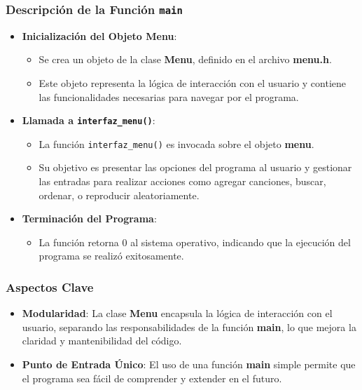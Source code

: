 \documentclass[corference]{IEEEtran}
\begin{document}
\begin{flushleft}
        \subsubsection{Descripción de la Función \texttt{main}}
        
            \begin{itemize}[left=4em]
                \item \textbf{Inicialización del Objeto Menu}: 
                \begin{itemize}
                    \item Se crea un objeto de la clase \textbf{Menu}, definido en el archivo \textbf{menu.h}.
                    \item Este objeto representa la lógica de interacción con el usuario y contiene las funcionalidades necesarias para navegar por el programa.
                \end{itemize}
            
                \item \textbf{Llamada a \texttt{interfaz\_menu()}}:
                \begin{itemize}
                    \item La función \texttt{interfaz\_menu()} es invocada sobre el objeto \textbf{menu}.
                    \item Su objetivo es presentar las opciones del programa al usuario y gestionar las entradas para realizar acciones como agregar canciones, buscar, ordenar, o reproducir aleatoriamente.
                \end{itemize}
            
                \item \textbf{Terminación del Programa}:
                \begin{itemize}
                    \item La función retorna 0 al sistema operativo, indicando que la ejecución del programa se realizó exitosamente.
                \end{itemize}
            \end{itemize}
        
        \subsubsection{Aspectos Clave}
        
            \begin{itemize}[left=4em]
                \item \textbf{Modularidad}: La clase \textbf{Menu} encapsula la lógica de interacción con el usuario, separando las responsabilidades de la función \textbf{main}, lo que mejora la claridad y mantenibilidad del código.
                \item \textbf{Punto de Entrada Único}: El uso de una función \textbf{main} simple permite que el programa sea fácil de comprender y extender en el futuro.
            \end{itemize}
                

\end{flushleft}
\end{document}
